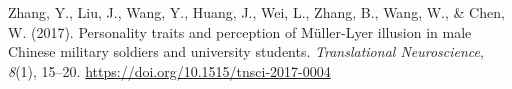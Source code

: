 \documentclass[
  man,floatsintext]{apa6}
\newlength{\cslhangindent}
\newlength{\cslentryspacingunit} %
\newenvironment{CSLReferences}[2] %
 {%
  \setlength{\parindent}{0pt}
  \ifodd #1
  \let\oldpar\par
  \def\par{\hangindent=\cslhangindent\oldpar}
  \fi
  \setlength{\parskip}{#2\cslentryspacingunit}
 }%
 {}
\begin{document}
\begin{CSLReferences}{1}{0}
\leavevmode{}%
Zhang, Y., Liu, J., Wang, Y., Huang, J., Wei, L., Zhang, B., Wang, W., \& Chen, W. (2017). Personality traits and perception of Müller-Lyer illusion in male Chinese military soldiers and university students. \emph{Translational Neuroscience}, \emph{8}(1), 15--20. \url{https://doi.org/10.1515/tnsci-2017-0004}

\end{CSLReferences}


\clearpage
\renewcommand{\listfigurename}{Figure captions}
\end{document}
